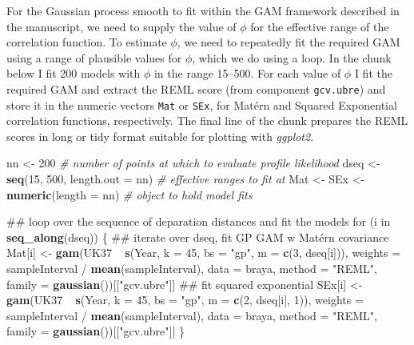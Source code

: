 \documentclass[12pt,]{article}
\newenvironment{Shaded}{\begin{snugshade}}{\end{snugshade}}
\newcommand{\KeywordTok}[1]{\textcolor[rgb]{0.13,0.29,0.53}{\textbf{{#1}}}}
\newcommand{\DataTypeTok}[1]{\textcolor[rgb]{0.13,0.29,0.53}{{#1}}}
\newcommand{\DecValTok}[1]{\textcolor[rgb]{0.00,0.00,0.81}{{#1}}}
\newcommand{\StringTok}[1]{\textcolor[rgb]{0.31,0.60,0.02}{{#1}}}
\newcommand{\CommentTok}[1]{\textcolor[rgb]{0.56,0.35,0.01}{\textit{{#1}}}}
\newcommand{\NormalTok}[1]{{#1}}
\begin{document}
For the Gaussian process smooth to fit within the GAM framework
described in the manuscript, we need to supply the value of \(\phi\) for
the effective range of the correlation function. To estimate \(\phi\),
we need to repeatedly fit the required GAM using a range of plausible
values for \(\phi\), which we do using a loop. In the chunk below I fit
200 models with \(\phi\) in the range 15--500. For each value of
\(\phi\) I fit the required GAM and extract the REML score (from
component \texttt{gcv.ubre}) and store it in the numeric vectors
\texttt{Mat} or \texttt{SEx}, for Matérn and Squared Exponential
correlation functions, respectively. The final line of the chunk
prepares the REML scores in long or tidy format suitable for plotting
with \emph{ggplot2}.

\begin{Shaded}
\begin{Highlighting}[]
\NormalTok{nn <-}\StringTok{ }\DecValTok{200}    \CommentTok{# number of points at which to evaluate profile likelihood}
\NormalTok{dseq <-}\StringTok{ }\KeywordTok{seq}\NormalTok{(}\DecValTok{15}\NormalTok{, }\DecValTok{500}\NormalTok{, }\DataTypeTok{length.out =} \NormalTok{nn)  }\CommentTok{# effective ranges to fit at}
\NormalTok{Mat <-}\StringTok{ }\NormalTok{SEx <-}\StringTok{ }\KeywordTok{numeric}\NormalTok{(}\DataTypeTok{length =} \NormalTok{nn)     }\CommentTok{# object to hold model fits}

\NormalTok{## loop over the sequence of deparation distances and fit the models}
\NormalTok{for (i in }\KeywordTok{seq_along}\NormalTok{(dseq)) \{ }
    \NormalTok{## iterate over dseq, fit GP GAM w Matérn covariance}
    \NormalTok{Mat[i] <-}\StringTok{ }\KeywordTok{gam}\NormalTok{(UK37 ~}\StringTok{ }\KeywordTok{s}\NormalTok{(Year, }\DataTypeTok{k =} \DecValTok{45}\NormalTok{, }\DataTypeTok{bs =} \StringTok{"gp"}\NormalTok{, }\DataTypeTok{m =} \KeywordTok{c}\NormalTok{(}\DecValTok{3}\NormalTok{, dseq[i])),}
                  \DataTypeTok{weights =} \NormalTok{sampleInterval /}\StringTok{ }\KeywordTok{mean}\NormalTok{(sampleInterval),}
                  \DataTypeTok{data =} \NormalTok{braya, }\DataTypeTok{method =} \StringTok{"REML"}\NormalTok{,}
                  \DataTypeTok{family =} \KeywordTok{gaussian}\NormalTok{())[[}\StringTok{"gcv.ubre"}\NormalTok{]]}
    \NormalTok{## fit squared exponential}
    \NormalTok{SEx[i] <-}\StringTok{ }\KeywordTok{gam}\NormalTok{(UK37 ~}\StringTok{ }\KeywordTok{s}\NormalTok{(Year, }\DataTypeTok{k =} \DecValTok{45}\NormalTok{, }\DataTypeTok{bs =} \StringTok{"gp"}\NormalTok{, }\DataTypeTok{m =} \KeywordTok{c}\NormalTok{(}\DecValTok{2}\NormalTok{, dseq[i], }\DecValTok{1}\NormalTok{)),}
                  \DataTypeTok{weights =} \NormalTok{sampleInterval /}\StringTok{ }\KeywordTok{mean}\NormalTok{(sampleInterval),}
                  \DataTypeTok{data =} \NormalTok{braya, }\DataTypeTok{method =} \StringTok{"REML"}\NormalTok{,}
                  \DataTypeTok{family =} \KeywordTok{gaussian}\NormalTok{())[[}\StringTok{"gcv.ubre"}\NormalTok{]]}
\NormalTok{\}}


\end{Highlighting}
\end{Shaded}
\end{document}
